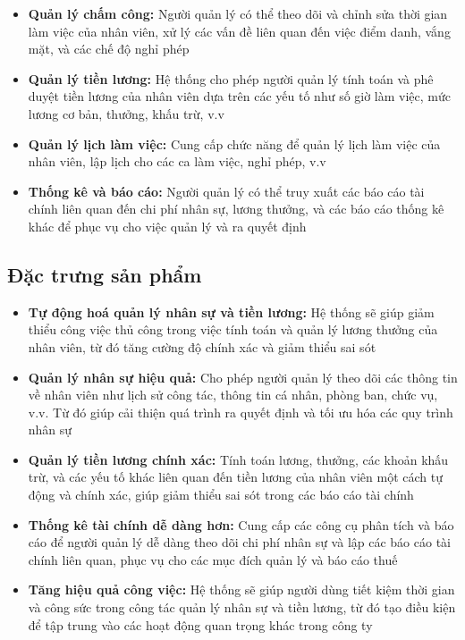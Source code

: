 \begin{itemize}
\begin{itemize}
        \item \textbf{Quản lý chấm công:} Người quản lý có thể theo dõi và chỉnh sửa thời gian làm việc của nhân viên, xử lý các vấn đề liên quan đến việc điểm danh, vắng mặt, và các chế độ nghỉ phép
        \item \textbf{Quản lý tiền lương:} Hệ thống cho phép người quản lý tính toán và phê duyệt tiền lương của nhân viên dựa trên các yếu tố như số giờ làm việc, mức lương cơ bản, thưởng, khấu trừ, v.v
        \item \textbf{Quản lý lịch làm việc:} Cung cấp chức năng để quản lý lịch làm việc của nhân viên, lập lịch cho các ca làm việc, nghỉ phép, v.v
        \item \textbf{Thống kê và báo cáo:} Người quản lý có thể truy xuất các báo cáo tài chính liên quan đến chi phí nhân sự, lương thưởng, và các báo cáo thống kê khác để phục vụ cho việc quản lý và ra quyết định
    \end{itemize}
\end{itemize}
\subsection{Đặc trưng sản phẩm}
\begin{itemize}
\item \textbf{Tự động hoá quản lý nhân sự và tiền lương:} Hệ thống sẽ giúp giảm thiểu công việc thủ công trong việc tính toán và quản lý lương thưởng của nhân viên, từ đó tăng cường độ chính xác và giảm thiểu sai sót
\item \textbf{Quản lý nhân sự hiệu quả:} Cho phép người quản lý theo dõi các thông tin về nhân viên như lịch sử công tác, thông tin cá nhân, phòng ban, chức vụ, v.v. Từ đó giúp cải thiện quá trình ra quyết định và tối ưu hóa các quy trình nhân sự
\item \textbf{Quản lý tiền lương chính xác:} Tính toán lương, thưởng, các khoản khấu trừ, và các yếu tố khác liên quan đến tiền lương của nhân viên một cách tự động và chính xác, giúp giảm thiểu sai sót trong các báo cáo tài chính
\item \textbf{Thống kê tài chính dễ dàng hơn:} Cung cấp các công cụ phân tích và báo cáo để người quản lý dễ dàng theo dõi chi phí nhân sự và lập các báo cáo tài chính liên quan, phục vụ cho các mục đích quản lý và báo cáo thuế
\item \textbf{Tăng hiệu quả công việc:} Hệ thống sẽ giúp người dùng tiết kiệm thời gian và công sức trong công tác quản lý nhân sự và tiền lương, từ đó tạo điều kiện để tập trung vào các hoạt động quan trọng khác trong công ty
\end{itemize}
